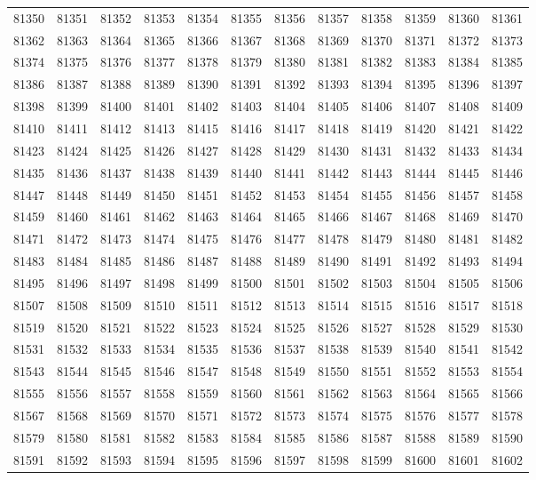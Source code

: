 \begin{center}
\begin{longtable}{llllllllllll}
81350 &81351 &81352 &81353 &81354 &81355 &81356 &81357 &81358 &81359 &81360 &81361 \\
81362 &81363 &81364 &81365 &81366 &81367 &81368 &81369 &81370 &81371 &81372 &81373 \\
81374 &81375 &81376 &81377 &81378 &81379 &81380 &81381 &81382 &81383 &81384 &81385 \\
81386 &81387 &81388 &81389 &81390 &81391 &81392 &81393 &81394 &81395 &81396 &81397 \\
81398 &81399 &81400 &81401 &81402 &81403 &81404 &81405 &81406 &81407 &81408 &81409 \\
81410 &81411 &81412 &81413 &81415 &81416 &81417 &81418 &81419 &81420 &81421 &81422 \\
81423 &81424 &81425 &81426 &81427 &81428 &81429 &81430 &81431 &81432 &81433 &81434 \\
81435 &81436 &81437 &81438 &81439 &81440 &81441 &81442 &81443 &81444 &81445 &81446 \\
81447 &81448 &81449 &81450 &81451 &81452 &81453 &81454 &81455 &81456 &81457 &81458 \\
81459 &81460 &81461 &81462 &81463 &81464 &81465 &81466 &81467 &81468 &81469 &81470 \\
81471 &81472 &81473 &81474 &81475 &81476 &81477 &81478 &81479 &81480 &81481 &81482 \\
81483 &81484 &81485 &81486 &81487 &81488 &81489 &81490 &81491 &81492 &81493 &81494 \\
81495 &81496 &81497 &81498 &81499 &81500 &81501 &81502 &81503 &81504 &81505 &81506 \\
81507 &81508 &81509 &81510 &81511 &81512 &81513 &81514 &81515 &81516 &81517 &81518 \\
81519 &81520 &81521 &81522 &81523 &81524 &81525 &81526 &81527 &81528 &81529 &81530 \\
81531 &81532 &81533 &81534 &81535 &81536 &81537 &81538 &81539 &81540 &81541 &81542 \\
81543 &81544 &81545 &81546 &81547 &81548 &81549 &81550 &81551 &81552 &81553 &81554 \\
81555 &81556 &81557 &81558 &81559 &81560 &81561 &81562 &81563 &81564 &81565 &81566 \\
81567 &81568 &81569 &81570 &81571 &81572 &81573 &81574 &81575 &81576 &81577 &81578 \\
81579 &81580 &81581 &81582 &81583 &81584 &81585 &81586 &81587 &81588 &81589 &81590 \\
81591 &81592 &81593 &81594 &81595 &81596 &81597 &81598 &81599 &81600 &81601 &81602 \\

\end{longtable}
\end{center}
